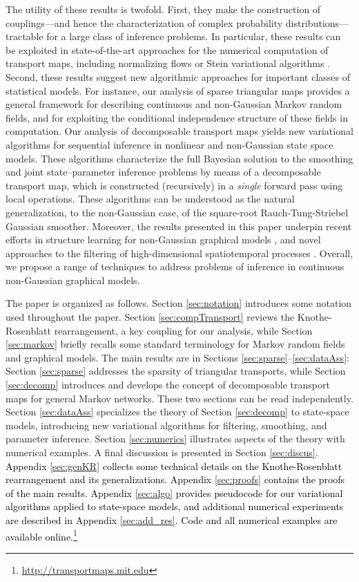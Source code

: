 \documentclass[twoside,11pt]{article}
\newcommand{\hrevone}{\textcolor{black} }
\begin{document}
The utility of these results is twofold.
First, they
make the construction of couplings---and hence the characterization of complex probability distributions---tractable for a large class of inference problems. 
In particular, these results can be exploited in
state-of-the-art approaches for the numerical computation of
transport maps, including normalizing flows 
%
or Stein variational algorithms
%
\citep{rezende2015variational, detommaso2018stein}.
Second, %
these results suggest new algorithmic approaches %
for important classes of statistical models. %
%
For instance, our analysis of sparse triangular maps provides a
general framework for describing continuous and non-Gaussian Markov
random fields, and for exploiting the conditional independence
structure of these fields in computation.  Our analysis of
decomposable transport maps yields new variational algorithms for
sequential inference in nonlinear and non-Gaussian state space
models. These algorithms characterize the full Bayesian solution to
%
the smoothing and joint state--parameter
inference problems by means of a decomposable
%
%
transport map, which is constructed (recursively) in a
{\it single} forward pass using local operations.
%
%
%
%
These algorithms can be
%
understood as the natural generalization, to the non-Gaussian case, of
the square-root Rauch-Tung-Striebel Gaussian smoother.  Moreover, the
results presented in this paper underpin %
recent
efforts in structure learning for 
%
%
non-Gaussian
graphical models \citep{morrison2017beyond}, and novel approaches to the
%
filtering of high-dimensional spatiotemporal processes 
\citep[Ch.~6]{spantini2017inference}.  Overall, we propose a range of techniques
to address  problems of  inference in continuous
non-Gaussian graphical models. 
%

The paper is organized as follows.  
%
Section \ref{sec:notation} introduces some notation used throughout the paper.
Section \ref{sec:compTransport} reviews the %
Knothe-Rosenblatt rearrangement, a key coupling for our analysis,
while Section \ref{sec:markov} briefly recalls some standard
terminology for Markov random fields and graphical models.
%
The main results are in Sections \ref{sec:sparse}--\ref{sec:dataAss}:
Section \ref{sec:sparse} addresses the sparsity of triangular
transports, while Section \ref{sec:decomp} introduces and develops the
concept of decomposable transport maps for general Markov networks.
These two sections can be read independently.
%
%
%
Section \ref{sec:dataAss} specializes the theory of Section
\ref{sec:decomp} to state-space models, 
%
%
introducing new variational %
algorithms for filtering, smoothing, and parameter inference.
%
%
Section \ref{sec:numerics} illustrates aspects of the theory with numerical examples. A final discussion is presented in Section
\ref{sec:discus}.
%
\hrevone{ 
Appendix \ref{sec:genKR} collects some technical details on the Knothe-Rosenblatt rearrangement and its generalizations. Appendix \ref{sec:proofs} contains the proofs of the main results.
%
%
Appendix \ref{sec:algo} provides pseudocode for our variational algorithms applied to state-space models, and additional numerical experiments 
%
are described in Appendix \ref{sec:add_res}.
%
Code and all numerical examples are available online.\footnote{\url{http://transportmaps.mit.edu}}
}
\end{document}
